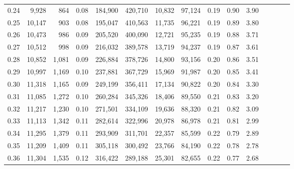 \begin{tabular}{rrrcrrrrrrrrrrr}
0.24 &   9,928 &    864 &                                       0.08 &  184,900 &  420,710 &   10,832 &   97,124 &  0.19 &  0.90 &                         3.90 \\
0.25 &  10,147 &    903 &                                       0.08 &  195,047 &  410,563 &   11,735 &   96,221 &  0.19 &  0.89 &                         3.80 \\
0.26 &  10,473 &    986 &                                       0.09 &  205,520 &  400,090 &   12,721 &   95,235 &  0.19 &  0.88 &                         3.71 \\
0.27 &  10,512 &    998 &                                       0.09 &  216,032 &  389,578 &   13,719 &   94,237 &  0.19 &  0.87 &                         3.61 \\
0.28 &  10,852 &  1,081 &                                       0.09 &  226,884 &  378,726 &   14,800 &   93,156 &  0.20 &  0.86 &                         3.51 \\
0.29 &  10,997 &  1,169 &                                       0.10 &  237,881 &  367,729 &   15,969 &   91,987 &  0.20 &  0.85 &                         3.41 \\
0.30 &  11,318 &  1,165 &                                       0.09 &  249,199 &  356,411 &   17,134 &   90,822 &  0.20 &  0.84 &                         3.30 \\
0.31 &  11,085 &  1,272 &                                       0.10 &  260,284 &  345,326 &   18,406 &   89,550 &  0.21 &  0.83 &                         3.20 \\
0.32 &  11,217 &  1,230 &                                       0.10 &  271,501 &  334,109 &   19,636 &   88,320 &  0.21 &  0.82 &                         3.09 \\
0.33 &  11,113 &  1,342 &                                       0.11 &  282,614 &  322,996 &   20,978 &   86,978 &  0.21 &  0.81 &                         2.99 \\
0.34 &  11,295 &  1,379 &                                       0.11 &  293,909 &  311,701 &   22,357 &   85,599 &  0.22 &  0.79 &                         2.89 \\
0.35 &  11,209 &  1,409 &                                       0.11 &  305,118 &  300,492 &   23,766 &   84,190 &  0.22 &  0.78 &                         2.78 \\
0.36 &  11,304 &  1,535 &                                       0.12 &  316,422 &  289,188 &   25,301 &   82,655 &  0.22 &  0.77 &                         2.68 \\

\end{tabular}
